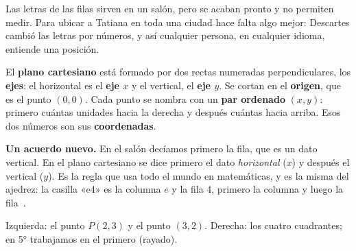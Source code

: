 \documentclass[11pt]{article}
\newcommand{\ejes}[2]{%
  \draw[gray!45] (0,0) grid (#1,#2);
  \draw[->, thick] (0,0) -- (#1+0.5,0) node[right, font=\small] {$x$};
  \draw[->, thick] (0,0) -- (0,#2+0.5) node[above, font=\small] {$y$};
  \foreach \i in {1,...,#1}
    \node[below, font=\scriptsize, text height=1.5ex, text depth=0.25ex] at (\i,0) {\i};
  \foreach \j in {1,...,#2} \node[left, font=\scriptsize] at (0,\j) {\j};
  \node[below left, font=\scriptsize] at (0,0) {0};}
\begin{document}
\label{tema:plano}

\begin{hilo}
Las letras de las filas sirven en un salón, pero se acaban pronto y no permiten medir. Para
ubicar a Tatiana en toda una ciudad hace falta algo mejor: Descartes cambió las letras por
números, y así cualquier persona, en cualquier idioma, entiende una posición.
\end{hilo}

\begin{definicion}
El \textbf{plano cartesiano} está formado por dos rectas numeradas perpendiculares, los
\textbf{ejes}: el horizontal es el \textbf{eje $x$} y el vertical, el \textbf{eje $y$}. Se
cortan en el \textbf{origen}, que es el punto $(0, 0)$. Cada punto se nombra con un
\textbf{par ordenado} $(x, y)$: primero cuántas unidades hacia la derecha y después cuántas
hacia arriba. Esos dos números son sus \textbf{coordenadas}.
\end{definicion}

\textbf{Un acuerdo nuevo.} En el salón decíamos primero la fila, que es un dato vertical. En el
plano cartesiano se dice primero el dato \emph{horizontal} ($x$) y después el vertical ($y$).
Es la regla que usa todo el mundo en matemáticas, y es la misma del ajedrez: la casilla «e4» es
la columna $e$ y la fila 4, primero la columna y luego la fila~\cite{fide}.

\begin{center}
\hspace{1cm}

{\footnotesize Izquierda: el punto $P(2, 3)$ y el punto $(3, 2)$. Derecha: los cuatro
cuadrantes; en 5° trabajamos en el primero (rayado).}
\end{center}
\end{document}
